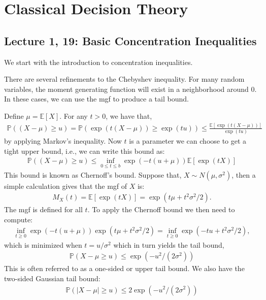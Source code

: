 \chapter{Classical Decision Theory}

\section{Lecture 1, 19: Basic Concentration Inequalities}

We start with the introduction to concentration inequalities.

There are several refinements to the Chebyshev inequality. For many random variables, the moment generating function will exist in a neighborhood around 0. In these cases, we can use the mgf to produce a tail bound.

Define $\mu=\mathbb{E}[X]$. For any $t>0$, we have that,
\begin{align*}
\mathbb{P}((X-\mu) \geq u)=\mathbb{P}(\exp (t(X-\mu)) \geq \exp (t u)) \leq \frac{\mathbb{E}[\exp (t(X-\mu))]}{\exp (t u)}
\end{align*}
by applying Markov's inequality. Now $t$ is a parameter we can choose to get a tight upper bound, i.e., we can write this bound as:
\begin{align*}
\mathbb{P}((X-\mu) \geq u) \leq \inf _{0 \leq t \leq b} \exp (-t(u+\mu)) \mathbb{E}[\exp (t X)]
\end{align*}
This bound is known as Chernoff's bound. Suppose that, $X \sim N\left(\mu, \sigma^2\right)$, then a simple calculation gives that the mgf of $X$ is:
\begin{align*}
M_X(t)=\mathbb{E}[\exp (t X)]=\exp \left(t \mu+t^2 \sigma^2 / 2\right) .
\end{align*}
The mgf is defined for all $t$. To apply the Chernoff bound we then need to compute:
\begin{align*}
\inf _{t \geq 0} \exp (-t(u+\mu)) \exp \left(t \mu+t^2 \sigma^2 / 2\right)=\inf _{t \geq 0} \exp \left(-t u+t^2 \sigma^2 / 2\right),
\end{align*}
which is minimized when $t=u / \sigma^2$ which in turn yields the tail bound,
\begin{align*}
\mathbb{P}(X-\mu \geq u) \leq \exp \left(-u^2 /\left(2 \sigma^2\right)\right)
\end{align*}
This is often referred to as a one-sided or upper tail bound. We also have the two-sided Gaussian tail bound:
\begin{align*}
\mathbb{P}(|X-\mu| \geq u) \leq 2 \exp \left(-u^2 /\left(2 \sigma^2\right)\right)
\end{align*}

